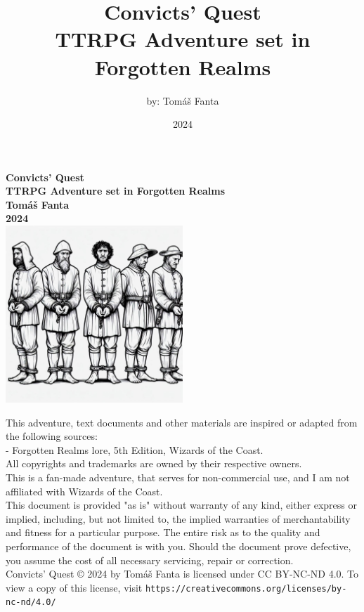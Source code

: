 \documentclass[10pt,onecolumn,twoside,openany,bg=full,layout=true]{dndbook}
\begin{document}
\frontmatter
\title {Convicts' Quest\\ \large TTRPG Adventure set in Forgotten Realms}
\author {by: Tomáš Fanta}
\date {2024}



\begin{titlepage}
    \centering
    \textbf {\huge Convicts' Quest\\\large TTRPG Adventure set in Forgotten Realms\\}
    \textbf {Tomáš Fanta\\}
    \textbf {2024\\}
    \vspace{1.5cm}
    \includegraphics[width=0.5\textwidth]{img/title}\\[1cm]

    \vfill
    \begin{flushleft}
      \footnotesize
      This adventure, text documents and other materials are inspired or adapted from the following sources:\\
      - Forgotten Realms lore, 5th Edition, Wizards of the Coast.\\
      All copyrights and trademarks are owned by their respective owners.\\
      This is a fan-made adventure, that serves for non-commercial use, and I am not affiliated with Wizards of the Coast.\\
      This document is provided "as is" without warranty of any kind, either express or implied, including, but not limited to,
      the implied warranties of merchantability and fitness for a particular purpose.
      The entire risk as to the quality and performance of the document is with you.
      Should the document prove defective, you assume the cost of all necessary servicing, repair or correction.\\
      Convicts' Quest © 2024 by Tomáš Fanta is licensed under CC BY-NC-ND 4.0. To view a copy of this license, visit \texttt{https://creativecommons.org/licenses/by-nc-nd/4.0/}
    \end{flushleft}
\end{titlepage}
\end{document}
